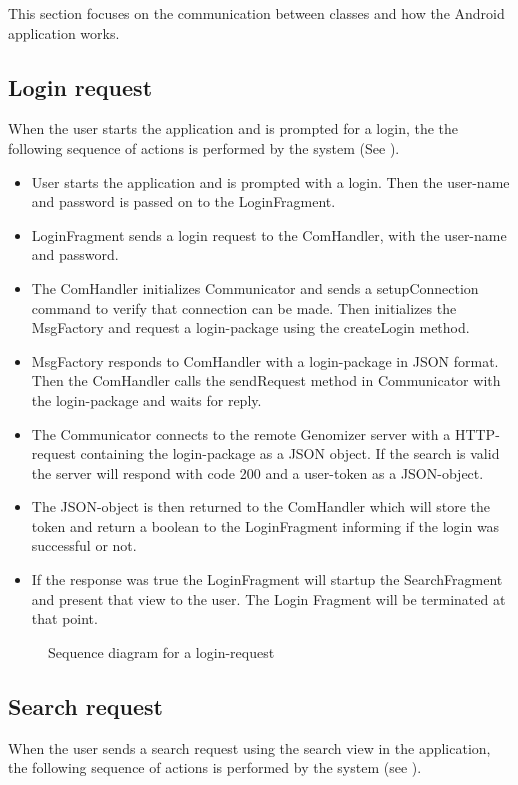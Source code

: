 This section focuses on the communication  between classes and how the Android application works.
\subsection{Login request}
	When the user starts the application and is prompted for a login, the the following sequence of actions is performed by the system (See ).	\\
	
	\begin{itemize}
		\item
			User starts the application and is prompted with a login.
			Then the user-name and password is passed on to the LoginFragment.
		\item
			LoginFragment sends a login request to the ComHandler, with the user-name and password.
		\item
			The ComHandler initializes Communicator and sends a setupConnection command to verify that connection can be made. Then initializes the MsgFactory and request a login-package using the createLogin method.
		\item
			MsgFactory responds to ComHandler with a login-package in JSON format. Then the ComHandler calls the sendRequest method in Communicator with the login-package and waits for reply.
		\item
			The Communicator connects to the remote Genomizer server with a HTTP-request containing the login-package as a JSON object. If the search is valid the server will respond with code 200 and a user-token as a JSON-object.
		\item
			The JSON-object is then returned to the ComHandler which will store the token and return a boolean to the LoginFragment informing if the login was successful or not.
		\item 
			If the response was true the LoginFragment will startup the SearchFragment and present that view to the user. The Login Fragment will be terminated at that point. 
			
	\end{itemize}

	\begin{figure}[h]
		\caption{Sequence diagram for a login-request}
		\label{fig:and_loginseq}
	\end{figure}
	\FloatBarrier
\subsection{Search request}
	When the user sends a search request using the search view in the application, the following sequence of actions is performed by the system
	(see ).
	

